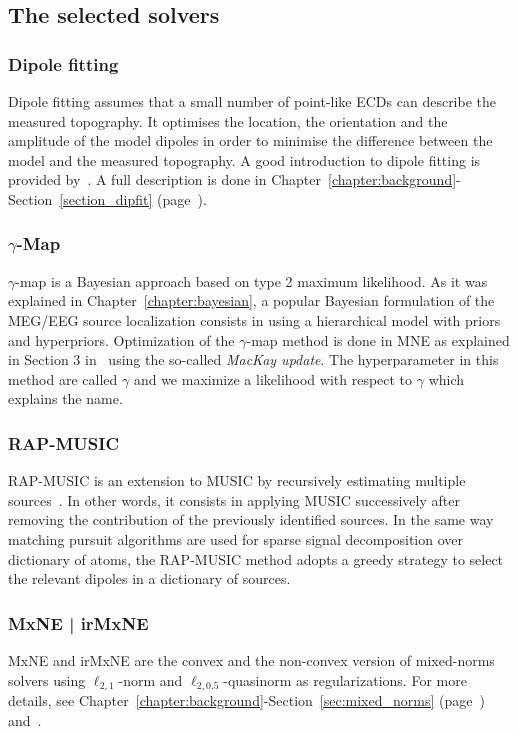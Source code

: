 \subsection{The selected solvers}
\subsubsection{Dipole fitting}
Dipole fitting assumes that a small number of point-like \ac{ECD}s can describe the measured topography. It optimises the location, the orientation and the amplitude of the model dipoles in order to minimise the difference between the model and the measured topography. A good introduction to dipole fitting is provided by~\cite{scherg1990fundamentals}. A full description is done in Chapter~\ref{chapter:background}-Section~\ref{section_dipfit} (page~\pageref{section_dipfit}).

\subsubsection{$\gamma$-Map}
$\gamma$-map is a Bayesian approach based on type 2 maximum likelihood. As it was explained in Chapter~\ref{chapter:bayesian}, a popular Bayesian formulation of the MEG/EEG source localization consists in using a hierarchical model with priors and hyperpriors. Optimization of the $\gamma$-map method is done in MNE as explained in Section 3 in~\cite{wipf2009unified} using the so-called \emph{MacKay update}. The hyperparameter in this method are called $\gamma$ and we maximize a likelihood with respect to $\gamma$ which explains the name.

\subsubsection{RAP-MUSIC}
\Ac{RAP-MUSIC} is an extension to \ac{MUSIC} by recursively estimating multiple sources~\cite{mosher1997source,mosher1999source}. In other words, it consists in applying MUSIC successively after removing the contribution of the previously identified sources. In the same way matching pursuit algorithms are used for sparse signal decomposition over dictionary of atoms, the RAP-MUSIC method adopts a greedy strategy to select the relevant dipoles in a dictionary of sources.

\subsubsection{MxNE | irMxNE}
\Ac{MxNE} and \ac{irMxNE} are the convex and the non-convex version of mixed-norms solvers using $\ell_{2,1}$-norm and $\ell_{2,0.5}$-quasinorm as regularizations. For more details, see Chapter~\ref{chapter:background}-Section~\ref{sec:mixed_norms} (page~\pageref{sec:mixed_norms}) and~\cite{gramfort2012mixed,strohmeier-etal:16}.


